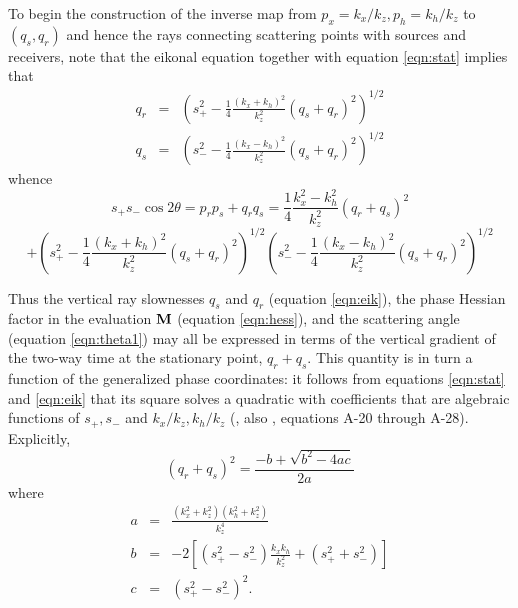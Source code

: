To begin the construction of the inverse map from
$p_x=k_x/k_z,p_h=k_h/k_z$ to $(q_s,q_r)$ and hence the rays connecting
scattering points with sources and receivers, note that the eikonal
equation together with equation \ref{eqn:stat} implies that
\begin{eqnarray}
q_r & = & \left(s_+^2 -
          \frac{1}{4}\frac{(k_x+k_h)^2}{k_z^2}(q_s+q_r)^2\right)^{1/2} \nonumber \\
\label{eqn:eik}
q_s & = & \left(s_-^2 -
          \frac{1}{4}\frac{(k_x-k_h)^2}{k_z^2}(q_s+q_r)^2\right)^{1/2}
\end{eqnarray}
whence
\[
s_+s_-\cos 2 \theta = p_rp_s + q_r q_s 
= \frac{1}{4}\frac{k_x^2-k_h^2}{k_z^2}(q_r+q_s)^2
\]
\begin{equation}
\label{eqn:theta1}
+  \left(s_+^2 -
          \frac{1}{4}\frac{(k_x+k_h)^2}{k_z^2}(q_s+q_r)^2\right)^{1/2}
\left(s_-^2 -
          \frac{1}{4}\frac{(k_x-k_h)^2}{k_z^2}(q_s+q_r)^2\right)^{1/2}
\end{equation}

Thus the vertical ray slownesses $q_s$ and $q_r$ (equation
\ref{eqn:eik}), the phase Hessian factor in the evaluation $\bf M$
(equation \ref{eqn:hess}), and the scattering angle (equation
\ref{eqn:theta1}) may all be expressed in terms of the vertical
gradient of the two-way time at the stationary point, $q_r+q_s$. This
quantity is in turn a function of the generalized phase
coordinates: it follows from equations \ref{eqn:stat} and
\ref{eqn:eik} that its square solves a quadratic with coefficients
that are algebraic functions of $s_+,s_-$ and $k_x/k_z, k_h/k_z$
(\cite[]{tenKroode:12}, also \cite[]{HouSymes:15}, equations A-20
through A-28). Explicitly, 
\begin{equation}
\label{eqn:dphidz}
(q_r+q_s)^2 = \frac{-b+\sqrt{b^2-4ac}}{2a}
\end{equation}
where
\begin{eqnarray}
a & = & \frac{(k_x^2+k_z^2)(k_h^2+k_z^2)}{k_z^4}\nonumber \\
b & = & -2 \left[(s_+^2-s_-^2)\frac{k_xk_h}{k_z^2} +
        (s_+^2+s_-^2)\right] \nonumber \\
\label{eqn:abc}
c & = & (s_+^2-s_-^2)^2.
\end{eqnarray}
 
